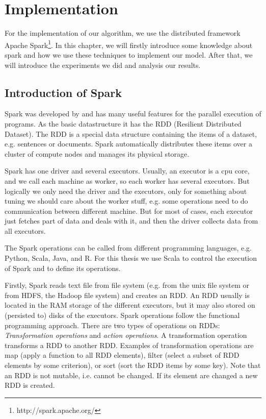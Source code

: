 \chapter{Implementation}
\label{cha:implementation}

For the implementation of our algorithm, we use the distributed framework Apache Spark\footnote{http://spark.apache.org/}. In this chapter, we will firstly introduce some knowledge about spark and how we use these techniques to implement our model. After that, we will introduce the experiments we did and analysis our results.


\section{Introduction of Spark}


Spark was developed by \cite{ZahariaChowdhuryEtAl2010} and has many useful features for the parallel execution of programs. As the basic datastructure it has the 
\gls{RDD} %
(Resilient Distributed Dataset). The RDD is a special data structure containing the items of a dataset, e.g. sentences or documents. Spark automatically distributes these items over a cluster of compute nodes and manages its physical storage. 

Spark has one driver and several executors. Usually, an executor is a cpu core, and we call each machine as worker, so each worker has several executors. But logically we only need the driver and the executors, only for something about tuning we should care about the worker stuff, e.g. some operations need to do communication between different machine. But for most of cases, each executor just fetches part of data and deals with it, and then the driver collects data from all executors.

The Spark operations can be called from different programming languages, e.g. Python, Scala, Java, and R. For this thesis we use Scala to control the execution of Spark and to define its operations.

Firstly, Spark reads text file from file system (e.g. from the unix file system or from HDFS, the Hadoop file system) and creates an RDD. An RDD usually is located in the RAM storage of the different executors, but it may also stored on (persisted to) disks of the executors. Spark operations follow the functional programming approach. There are two types of operations on RDDs: \emph{Transformation operations} and \emph{action operations}.  A transformation operation transforms  a RDD to another RDD. Examples of transformation operations are map (apply a function to all RDD elements), filter (select a subset of RDD elements by some criterion), or sort (sort the RDD items by some key). Note that an RDD is not mutable, i.e. cannot be changed. If its element are changed a new RDD is created. 


